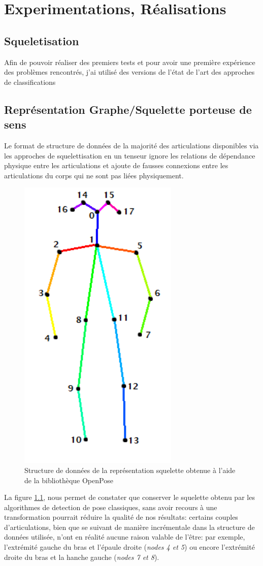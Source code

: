 \clearpage
\chapter{Experimentations, Réalisations}
\label{sec:SOTA}

\section{Squeletisation}
Afin de pouvoir réaliser des premiers tests  et pour avoir une première expérience des problèmes rencontrés, j'ai utilisé des versions de l'état de l'art des approches de classifications 

\section{Représentation Graphe/Squelette porteuse de sens}
Le format de structure de données de la majorité des articulations disponibles via les approches de squelettisation en un tenseur ignore les relations de dépendance physique entre les articulations et ajoute de fausses connexions entre les articulations du corps qui ne sont pas liées physiquement.

\begin{figure}[H]
    \centering
    \includegraphics[width=0.3\linewidth]{Images/openpose.png}
    \caption{Structure de données de la représentation squelette obtenue à l'aide de la bibliothèque OpenPose \cite{cao2017realtime}}
    \label{fig:openPoseSkel}
\end{figure}

La figure \ref{fig:openPoseSkel}, nous permet de constater que conserver le squelette obtenu par les algorithmes de detection de pose classiques, sans avoir recours à une transformation pourrait réduire la qualité de nos résultats: certains couples d'articulations, bien que se suivant de manière incrémentale dans la structure de données utilisée, n'ont en réalité aucune raison valable de l'être: par exemple, l'extrémité gauche du bras et l'épaule droite (\textit{nodes 4 et 5}) ou encore l'extrémité droite du bras et la hanche gauche (\textit{nodes 7 et 8}).

